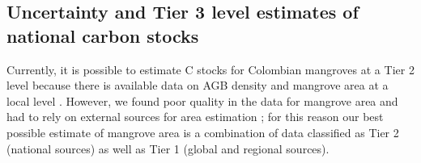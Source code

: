 \documentclass[review, authoryear]{elsarticle}   	%
\begin{document}
\subsection {Uncertainty and Tier 3 level estimates of national carbon stocks}



Currently, it is possible to estimate C stocks for Colombian mangroves at a Tier 2 level because there is available data on AGB density and mangrove area at a local level \citep{IPCC2003, IPCC2006}. However, we found poor quality in the data for mangrove area and had to rely on external sources for area estimation \citep[e.g.][]{Giri2010}; for this reason our best possible estimate of mangrove area is a combination of data  classified as Tier 2 (national sources) as well as Tier 1 (global and regional sources). 

\end{document}
